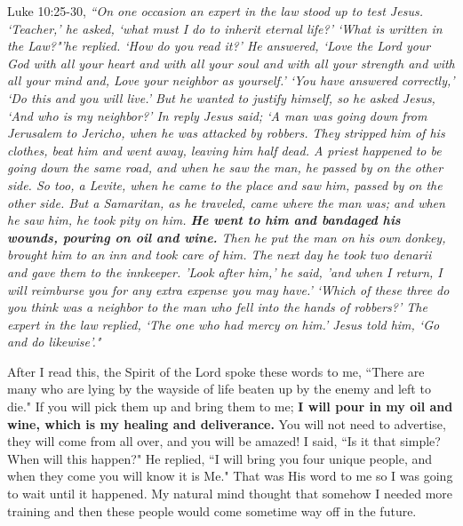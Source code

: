 \documentclass[oneside]{book}
\begin{document}
Luke 10:25-30, \textit{``On one occasion an expert in the law stood up to test Jesus. `Teacher,' he asked, `what must I do to inherit eternal life?' `What is written in the Law?"'he replied. `How do you read it?' He answered, `Love the Lord your God with all your heart and with all your soul and with all your strength and with all your mind and, Love your neighbor as yourself.' `You have answered correctly,' `Do this and you will live.' But he wanted to justify himself, so he asked Jesus, `And who is my neighbor?' In reply Jesus said; `A man was going down from Jerusalem to Jericho, when he was attacked by robbers. They stripped him of his clothes, beat him and went away, leaving him half dead. A priest happened to be going down the same road, and when he saw the man, he passed by on the other side. So too, a Levite, when he came to the place and saw him, passed by on the other side. But a Samaritan, as he traveled, came where the man was; and when he saw him, he took pity on him. \textbf{He went to him and bandaged his wounds, pouring on oil and wine.} Then he put the man on his own donkey, brought him to an inn and took care of him. The next day he took two denarii and gave them to the innkeeper. 'Look after him,' he said, 'and when I return, I will reimburse you for any extra expense you may have.' `Which of these three do you think was a neighbor to the man who fell into the hands of robbers?' The expert in the law replied, `The one who had mercy on him.' Jesus told him, `Go and do likewise'."}

After I read this, the Spirit of the Lord spoke these words to me, ``There are many who are lying by the wayside of life beaten up by the enemy and left to die." If you will pick them up and bring them to me; \textbf{I will pour in my oil and wine, which is my healing and deliverance.} You will not need to advertise, they will come from all over, and you will be amazed! I said, ``Is it that simple? When will this happen?" He replied, ``I will bring you four unique people, and when they come you will know it is Me." That was His word to me so I was going to wait until it happened. My natural mind thought that somehow I needed more training and then these people would come sometime way off in the future.
\end{document}
